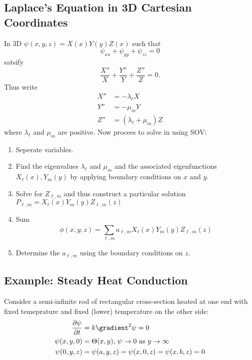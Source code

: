\documentclass[a4paper]{article}
\newcommand*{\grad}{\gradient}
\newcommand*{\laplace}{\grad^2}
\newcommand*{\lap}{\laplace}
\begin{document}
\subsection{Laplace's Equation in 3D Cartesian Coordinates}

In 3D \(\psi(x, y, z) = X(x) Y(y) Z(x)\) such that
\[
  \psi_{xx} +\psi_{yy} + \psi_{zz} = 0
\]
satsify
\[
  \frac{X''}{X} +\frac{Y''}{Y} +\frac{Z''}{Z} = 0 .
\]
Thus write
\begin{align*}
  X'' &= -\lambda_\ell X \\
  Y'' &= -\mu_m Y \\
  Z'' &= (\lambda_\ell + \mu_m) Z
\end{align*}
where \(\lambda_\ell\) and \(\mu_m\) are positive. Now procees to solve in using SOV:
\begin{enumerate}
\item Seperate variables.
\item Find the eigenvalues \(\lambda_\ell\) and \(\mu_m\) and the associated eigenfunctions \(X_\ell(x), Y_m(y)\) by applying boundary conditions on \(x\) and \(y\).
\item Solve for \(Z_{\ell,m}\) and thus construct a particular solution \(P_{\ell, m} = X_\ell(x) Y_m(y) Z_{\ell, m}(z)\)
\item Sum
  \[
    \phi(x, y, z) = \sum_{\ell, m}^{ } a_{\ell, m} X_\ell(x) Y_m(y) Z_{\ell, m}(z)
  \]
\item Determine the \(a_{\ell, m}\) using the boundary conditions on \(z\).
\end{enumerate}

\subsection{Example: Steady Heat Conduction}

Consider a semi-infinite rod of rectangular cross-section heated at one end with fixed temeprature and fixed (lower) temperature on the other side:
\begin{align*}
  \frac{\partial \psi}{\partial t} &= k \lap \psi = 0 \\
  \psi(x, y, 0) &= \Theta(x, y), \, \psi \to 0 \text{ as } y \to \infty \\
  \psi(0, y, z) &= \psi(a, y, z) = \psi(x, 0, z) = \psi(x, b, z) = 0
\end{align*}
\end{document}
